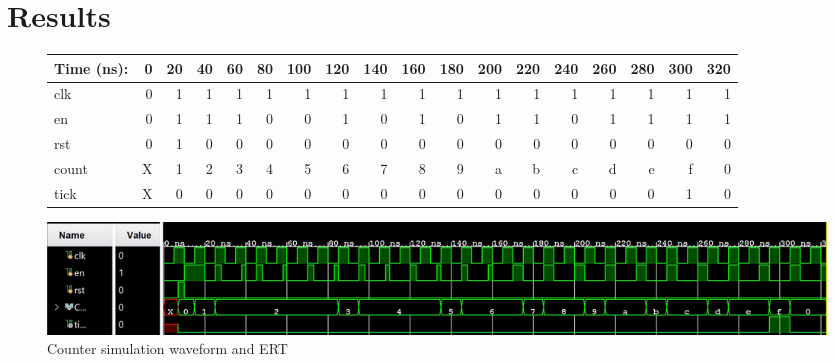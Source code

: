 \documentclass[11pt]{article}
\begin{document}
\clearpage
\section*{Results}

\begin{figure}[ht]\centering
	\begin{tabular}{l|rrrrrrrrrrrrrrrrr}
		Time (ns): & 0 & 20 & 40 & 60 & 80  & 100 & 120 & 140 & 160 & 180 & 200 & 220 & 240 & 260 & 280  & 300 & 320  \\
		\midrule
		clk & 0 & 1 & 1 & 1 & 1 & 1 & 1 & 1 & 1 & 1 & 1 & 1 & 1 & 1 & 1 & 1 & 1 \\
		en & 0 & 1 & 1 & 1 & 0 & 0 & 1 & 0 & 1 & 0 & 1 & 1 & 0 & 1 & 1 & 1 & 1 \\
		rst & 0 & 1 & 0 & 0 & 0 & 0 & 0 & 0 & 0 & 0 & 0 & 0 & 0 & 0 & 0 & 0 & 0 \\
		\midrule
		count & X & 1 & 2 & 3 & 4 & 5 & 6 & 7 & 8 & 9 & a & b & c & d & e & f & 0 \\
		tick & X & 0 & 0 & 0 & 0 & 0 & 0 & 0 & 0 & 0 & 0 & 0 & 0 & 0 & 0 & 1 & 0\\
		\bottomrule
	\end{tabular}\medskip
	
	\includegraphics[width=1.15 \textwidth]{Counter_Test.JPG}
	\caption{Counter simulation waveform and ERT}
	\label{fig:sim_with_table}
\end{figure}
\end{document}
